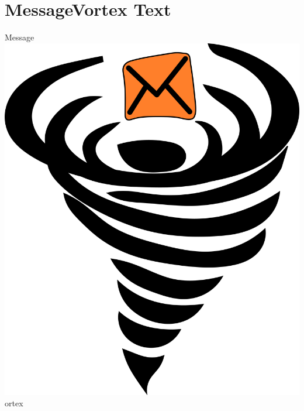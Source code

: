\documentclass[11pt]{extarticle}
\begin{document}
    \section{MessageVortex Text}
    {\selectfont%
     Message\includegraphics[height=1.1\fontcharht\font`V]{../../../../website/src/main/jbake/assets/images/MessageVortexLogo_huge}ortex}
	
\end{document}
